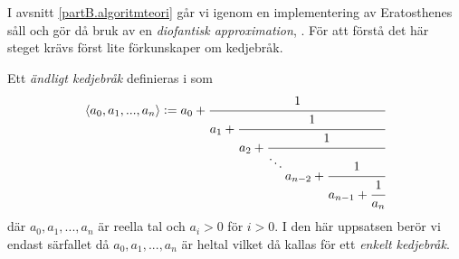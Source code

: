 
I avsnitt \ref{partB.algoritmteori} går vi igenom en implementering av Eratosthenes såll och gör då bruk av en \textit{diofantisk approximation}, \cite[algoritm 4]{HaraldSieve}. För att förstå det här steget krävs först lite förkunskaper om kedjebråk. 

Ett \textit{ändligt kedjebråk} definieras i \cite[definition 20.1]{Lindahl} som
\begin{align*}
    \langle a_0, a_1, ..., a_n \rangle := a_0 + \cfrac{1}{a_1 + \cfrac{1}{a_2 + \cfrac{1}{\ddots \raisebox{-3mm}{$a_{n-2}+\cfrac{1}{a_{n-1} + \cfrac{1}{a_n}}$}}}}
\end{align*}
där \(a_0, a_1, ..., a_n\) är reella tal och \(a_i > 0\) för \(i > 0\). I den här uppsatsen berör vi endast särfallet då \(a_0, a_1, ..., a_n\) är heltal vilket då kallas för ett \textit{enkelt kedjebråk}. 

